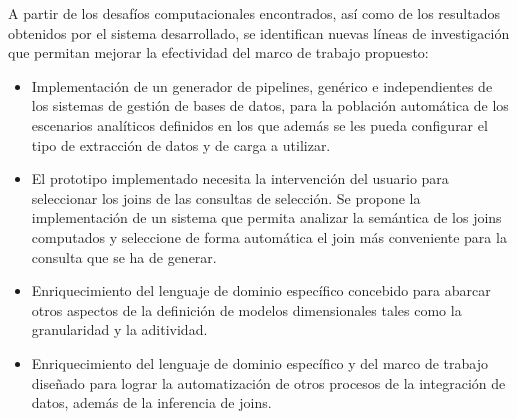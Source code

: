\begin{recomendations}
A partir de los desafíos computacionales encontrados, así como de los resultados
obtenidos por el sistema desarrollado, se identifican nuevas líneas de investigación que
permitan mejorar la efectividad del marco de trabajo propuesto:

\begin{itemize}
    \item Implementaci\'on de un generador de pipelines, gen\'erico e independientes de los sistemas 
        de gestión de bases de datos, para la poblaci\'on automática de los escenarios analíticos definidos en los 
        que adem\'as se les pueda configurar el tipo de extracción de datos y de carga a utilizar.
        
    \item El prototipo implementado necesita la intervención del usuario para seleccionar los joins
        de las consultas de selecci\'on. Se propone la implementaci\'on de un sistema que permita 
        analizar la semántica de los joins computados y seleccione de forma autom\'atica el join 
        m\'as conveniente para la consulta que se ha de generar.

    \item Enriquecimiento del lenguaje de dominio espec\'ifico concebido para abarcar otros aspectos 
        de la definición de modelos dimensionales tales como la granularidad y la aditividad. 
        
    \item Enriquecimiento del lenguaje de dominio espec\'ifico y del marco de trabajo diseñado 
        para lograr la automatizaci\'on de otros procesos de la integraci\'on de datos, además de la inferencia 
        de joins.
\end{itemize}

\end{recomendations}
